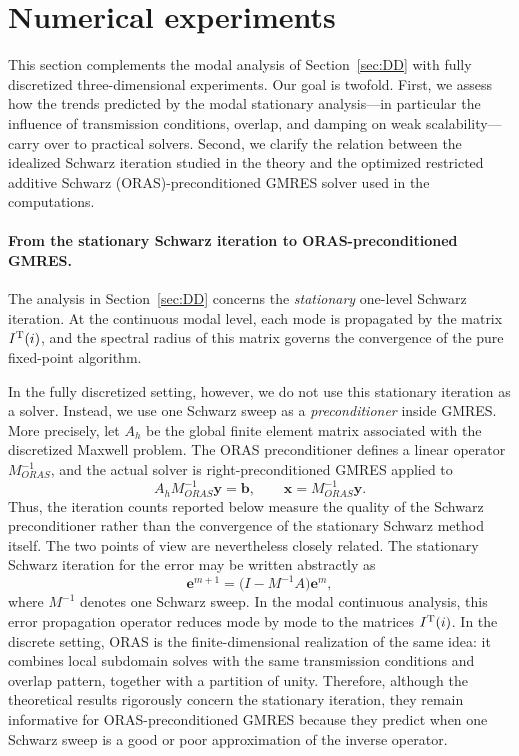 \documentclass[smallextended]{svjour3}       %
\begin{document}
\section{Numerical experiments}
\label{sec:numeric}

This section complements the modal analysis of Section~\ref{sec:DD} with fully discretized
three-dimensional experiments. Our goal is twofold. First, we assess how the trends predicted by
the modal stationary analysis---in particular the influence of transmission conditions, overlap,
and damping on weak scalability---carry over to practical solvers. Second, we clarify the relation
between the idealized Schwarz iteration studied in the theory and the optimized restricted additive Schwarz (ORAS)-preconditioned GMRES
solver used in the computations. 

\paragraph{From the stationary Schwarz iteration to ORAS-preconditioned GMRES.}
The analysis in Section~\ref{sec:DD} concerns the \emph{stationary} one-level Schwarz iteration.
At the continuous modal level, each mode is propagated by the matrix \(I^{\rm T}(i)\), and the
spectral radius of this matrix governs the convergence of the pure fixed-point algorithm.

In the fully discretized setting, however, we do not use this stationary iteration as a solver.
Instead, we use one Schwarz sweep as a \emph{preconditioner} inside GMRES. More precisely, let
\(A_h\) be the global finite element matrix associated with the discretized Maxwell problem. The
ORAS preconditioner defines a linear operator \(M_{ORAS}^{-1}\), and the actual solver is
right-preconditioned GMRES applied to
\[
A_h M_{ORAS}^{-1} \mathbf y = \mathbf b,
\qquad
\mathbf x = M_{ORAS}^{-1}\mathbf y.
\]
Thus, the iteration counts reported below measure the quality of the Schwarz preconditioner rather
than the convergence of the stationary Schwarz method itself. The two points of view are nevertheless closely related. The stationary Schwarz iteration for the
error may be written abstractly as
\[
\mathbf e^{m+1} = \bigl(I-M^{-1}A\bigr)\mathbf e^m,
\]
where \(M^{-1}\) denotes one Schwarz sweep. In the modal continuous analysis, this error
propagation operator reduces mode by mode to the matrices \(I^{\rm T}(i)\). In the discrete
setting, ORAS is the finite-dimensional realization of the same idea: it combines local subdomain
solves with the same transmission conditions and overlap pattern, together with a partition of
unity. Therefore, although the theoretical results rigorously concern the stationary iteration,
they remain informative for ORAS-preconditioned GMRES because they predict when one Schwarz sweep
is a good or poor approximation of the inverse operator.
\end{document}
